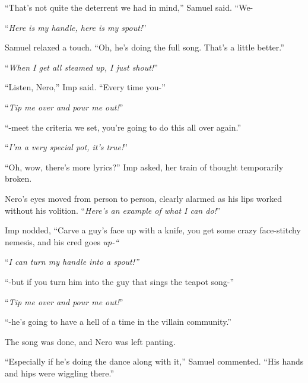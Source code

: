 ``That's not quite the deterrent we had in mind,'' Samuel said.  ``We-



``\emph{Here is my handle, here is my spout!}''



Samuel relaxed a touch.  ``Oh, he's doing the full song.  That's a little better.''



``\emph{When I get all steamed up, I just shout!}''



``Listen, Nero,''  Imp said.  ``Every time you-''



``\emph{Tip me over and pour me out!}''



``-meet the criteria we set, you're going to do this all over again.''



``\emph{I'm a very special pot, it's true!}''



``Oh, wow, there's more lyrics?'' Imp asked, her train of thought temporarily broken.



Nero's eyes moved from person to person, clearly alarmed as his lips worked without his volition.  ``\emph{Here's an example of what I can do!}''



Imp nodded, ``Carve a guy's face up with a knife, you get some crazy face-stitchy nemesis, and his cred goes \emph{up-``}



``\emph{I can turn my handle into a spout!''}



``-but if you turn him into the guy that sings the teapot song-''



``\emph{Tip me over and pour me out!}''



``-he's going to have a hell of a time in the villain community.''



The song was done, and Nero was left panting.



``Especially if he's doing the dance along with it,'' Samuel commented.  ``His hands and hips were wiggling there.''



